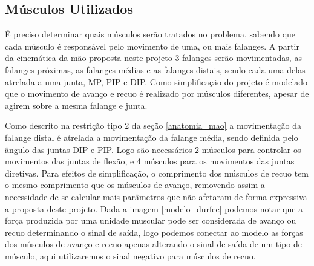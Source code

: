\subsection{Músculos Utilizados}
É preciso determinar quais músculos serão tratados no problema, sabendo que cada músculo é responsável pelo movimento de uma, ou mais falanges. A partir da cinemática da mão proposta neste projeto 3 falanges serão movimentadas, as falanges próximas, as falanges médias e as falanges distais, sendo cada uma delas atrelada a uma junta, MP, PIP e DIP. Como simplificação do projeto é modelado que o movimento de avanço e recuo é realizado por músculos diferentes, apesar de agirem sobre a mesma falange e junta. 

Como descrito na restrição tipo 2 da seção \ref{anatomia_mao} a movimentação da falange distal é atrelada a movimentação da falange média, sendo definida pelo ângulo das juntas DIP e PIP. Logo são necessários 2 músculos para controlar os movimentos das juntas de flexão, e 4 músculos para os movimentos das juntas diretivas. Para efeitos de simplificação, o comprimento dos músculos de recuo tem o mesmo comprimento que os músculos de avanço, removendo assim a necessidade de se calcular mais parâmetros que não afetaram de forma expressiva a proposta deste projeto. Dada a imagem \ref{modelo_durfee} podemos notar que a força produzida por uma unidade muscular pode ser considerada de avanço ou recuo determinando o sinal de saída, logo podemos conectar ao modelo as forças dos músculos de avanço e recuo apenas alterando o sinal de saída de um tipo de músculo, aqui utilizaremos o sinal negativo para músculos de recuo.

